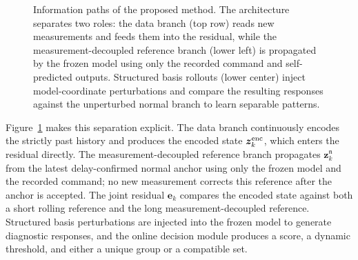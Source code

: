 \documentclass[journal]{IEEEtran}
\newcommand{\1}{\bm 1}
\begin{document}
\begin{figure}[t]
\centering
{}
\caption{Information paths of the proposed method. The architecture separates
two roles: the data branch (top row) reads new measurements and feeds them into
the residual, while the measurement-decoupled reference branch (lower left) is
propagated by the frozen model using only the recorded command and
self-predicted outputs. Structured basis rollouts (lower center) inject
model-coordinate perturbations and compare the resulting responses against the
unperturbed normal branch to learn separable patterns.}
\label{fig:architecture}
\end{figure}

Figure~\ref{fig:architecture} makes this separation explicit. The data branch
continuously encodes the strictly past history and produces the encoded state $\bm z_k^{\rm enc}$, which enters the residual
directly. The measurement-decoupled reference branch propagates $\bm
z_k^{\mathfrak n}$ from the latest delay-confirmed normal anchor using only
the frozen model and the recorded command; no new measurement corrects this
reference after the anchor is accepted. The joint residual $\bm e_k$ compares
the encoded state against both a short rolling reference and the long
measurement-decoupled reference. Structured basis perturbations are injected
into the frozen model to generate diagnostic responses, and the online
decision module produces a score, a dynamic threshold, and either a unique
group or a compatible set.
\end{document}
